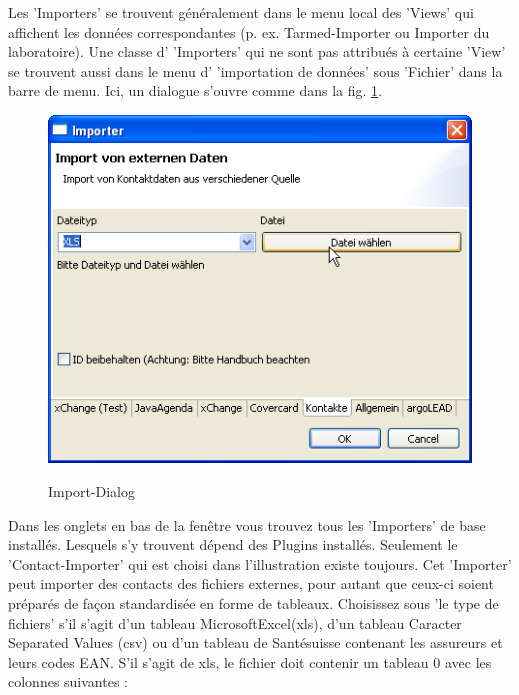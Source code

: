 Les 'Importers' se trouvent généralement dans le menu local des 'Views' qui affichent les données correspondantes (p. ex. Tarmed-Importer ou Importer du laboratoire). Une classe d' 'Importers' qui ne sont pas attribués à certaine 'View' se trouvent aussi dans le menu d' 'importation de données' sous 'Fichier' dans la barre de menu. Ici, un dialogue s'ouvre comme dans la fig. \ref{fig:importdlg}.
\begin{figure}
  \includegraphics{images/importdlg}\\
  \caption{Import-Dialog}\label{fig:importdlg}
\end{figure}
Dans les onglets en bas de la fenêtre vous trouvez tous les 'Importers' de base installés. Lesquels s'y trouvent dépend des Plugins installés. Seulement le 'Contact-Importer' qui est choisi dans l'illustration existe toujours. Cet 'Importer' peut importer des contacts des fichiers externes, pour autant que ceux-ci soient préparés de façon standardisée en forme de tableaux. Choisissez sous 'le type de fichiers' s'il s'agit d'un tableau Microsoft\texttrademark Excel\texttrademark(xls), d'un tableau Caracter Separated Values (csv) ou d'un tableau de Santésuisse contenant les assureurs et leurs codes EAN.
S'il s'agit de xls, le fichier doit contenir un tableau 0 avec les colonnes suivantes :


